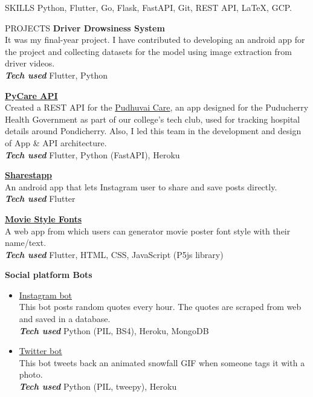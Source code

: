 \documentclass{template}
\begin{document}
\begin{rSection}{SKILLS}
Python, Flutter, Go, Flask, FastAPI, Git, REST API, \LaTeX, GCP.

\end{rSection}

\begin{rSection}{PROJECTS}
\textbf{Driver Drowsiness System} \\
It was my final-year project. I have contributed to developing an android app for the project and collecting datasets for the model using image extraction from driver videos. \\
\textbf{\textit{Tech used} } Flutter, Python

\textbf{\href{https://github.com/princesanjivy/pycare-api}{PyCare API}} \\
Created a REST API for the \href{https://sites.google.com/view/dscpec/pudhuvai-care}{Pudhuvai Care}, an app designed for the Puducherry Health Government as part of our college's tech club, used for tracking hospital details around Pondicherry. Also, I led this team in the development and design of App \& API architecture. \\
\textbf{\textit{Tech used} } Flutter, Python (FastAPI), Heroku

\textbf{\href{https://play.google.com/store/apps/details?id=com.princeappstudio.sharestapp}{Sharestapp}} \\ 
An android app that lets Instagram user to share and save posts directly. \\
\textbf{\textit{Tech used} } Flutter

\textbf{\href{https://github.com/princesanjivy/moviestylefonts}{Movie Style Fonts}} \\ 
A web app from which users can generator movie poster font style with their name/text. \\
\textbf{\textit{Tech used} } Flutter, HTML, CSS, JavaScript (P5js library)

\textbf{Social platform Bots}
\begin{itemize}
    \item \href{https://github.com/princesanjivy/instagram-quotebot}{Instagram bot} \\
    This bot posts random quotes every hour. The quotes are scraped from web and saved in a database. \\
    \textbf{\textit{Tech used} } Python (PIL, BS4), Heroku, MongoDB
    
    \item \href{https://github.com/princesanjivy/snowfall-twitterbot}{Twitter bot} \\
    This bot tweets back an animated snowfall GIF when someone tags it with a photo. \\
    \textbf{\textit{Tech used} } Python (PIL, tweepy), Heroku
    
\end{itemize}

\end{rSection} 
\end{document}
